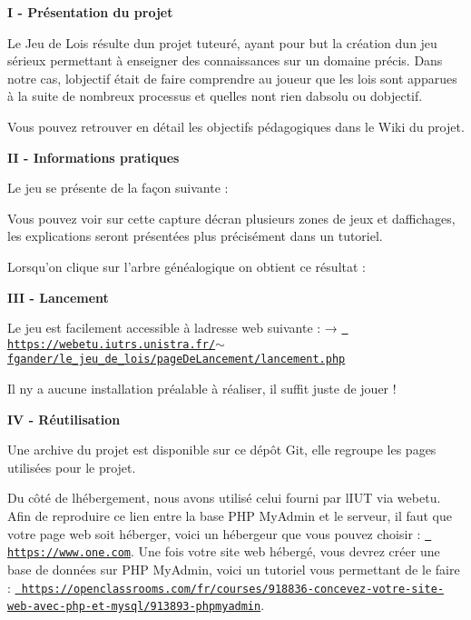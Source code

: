 {\bfseries{I -\/ Présentation du projet}}

Le Jeu de Lois résulte d\textquotesingle{}un projet tuteuré, ayant pour but la création d\textquotesingle{}un jeu sérieux permettant à enseigner des connaissances sur un domaine précis. Dans notre cas, l\textquotesingle{}objectif était de faire comprendre au joueur que les lois sont apparues à la suite de nombreux processus et qu\textquotesingle{}elles n\textquotesingle{}ont rien d\textquotesingle{}absolu ou d\textquotesingle{}objectif.

Vous pouvez retrouver en détail les objectifs pédagogiques dans le Wiki du projet.

{\bfseries{II -\/ Informations pratiques}}

Le jeu se présente de la façon suivante \+: ~\newline
 

Vous pouvez voir sur cette capture d\textquotesingle{}écran plusieurs zones de jeux et d\textquotesingle{}affichages, les explications seront présentées plus précisément dans un tutoriel.

Lorsqu’on clique sur l’arbre généalogique on obtient ce résultat \+: ~\newline
 

{\bfseries{I\+II -\/ Lancement}}

Le jeu est facilement accessible à l\textquotesingle{}adresse web suivante \+: → \href{https://webetu.iutrs.unistra.fr/~fgander/le_jeu_de_lois/pageDeLancement/lancement.php}{\texttt{ https\+://webetu.\+iutrs.\+unistra.\+fr/$\sim$fgander/le\+\_\+jeu\+\_\+de\+\_\+lois/page\+De\+Lancement/lancement.\+php}}

Il n\textquotesingle{}y a aucune installation préalable à réaliser, il suffit juste de jouer !

{\bfseries{IV -\/ Réutilisation}}

Une archive du projet est disponible sur ce dépôt Git, elle regroupe les pages utilisées pour le projet.

Du côté de l\textquotesingle{}hébergement, nous avons utilisé celui fourni par l\textquotesingle{}I\+UT via webetu. Afin de reproduire ce lien entre la base P\+HP My\+Admin et le serveur, il faut que votre page web soit héberger, voici un hébergeur que vous pouvez choisir \+: \href{https://www.one.com}{\texttt{ https\+://www.\+one.\+com}}. Une fois votre site web hébergé, vous devrez créer une base de données sur P\+HP My\+Admin, voici un tutoriel vous permettant de le faire \+: \href{https://openclassrooms.com/fr/courses/918836-concevez-votre-site-web-avec-php-et-mysql/913893-phpmyadmin}{\texttt{ https\+://openclassrooms.\+com/fr/courses/918836-\/concevez-\/votre-\/site-\/web-\/avec-\/php-\/et-\/mysql/913893-\/phpmyadmin}}. 